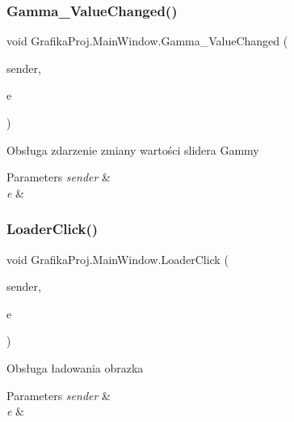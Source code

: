 \subsubsection{\texorpdfstring{Gamma\_ValueChanged()}{Gamma\_ValueChanged()}}
{\footnotesize\ttfamily void Grafika\+Proj.\+Main\+Window.\+Gamma\+\_\+\+Value\+Changed (\begin{DoxyParamCaption}\item[{object}]{sender,  }\item[{Routed\+Property\+Changed\+Event\+Args$<$ double $>$}]{e }\end{DoxyParamCaption})\hspace{0.3cm}{\ttfamily [private]}}



Obsługa zdarzenie zmiany wartości slider\textquotesingle{}a Gammy 


\begin{DoxyParams}{Parameters}
{\em sender} & \\
\hline
{\em e} & \\
\hline
\end{DoxyParams}
\mbox{\label{class_grafika_proj_1_1_main_window_a987805e1fd3b72da6a64a0134944a2bd}} 
\subsubsection{\texorpdfstring{LoaderClick()}{LoaderClick()}}
{\footnotesize\ttfamily void Grafika\+Proj.\+Main\+Window.\+Loader\+Click (\begin{DoxyParamCaption}\item[{object}]{sender,  }\item[{Routed\+Event\+Args}]{e }\end{DoxyParamCaption})\hspace{0.3cm}{\ttfamily [private]}}



Obsługa ładowania obrazka 


\begin{DoxyParams}{Parameters}
{\em sender} & \\
\hline
{\em e} & \\
\hline
\end{DoxyParams}
\mbox{\label{class_grafika_proj_1_1_main_window_af8f425f347eac5ffc828e032eef48496}} 

